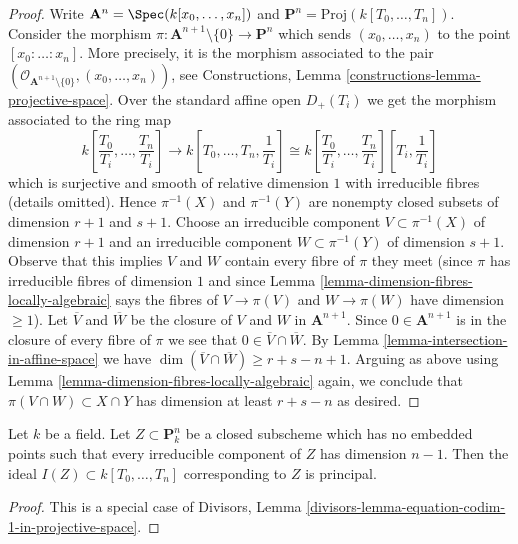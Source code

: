 \begin{proof}
Write $\mathbf{A}^n = \Spec(k[x_0, \ldots, x_n])$ and
$\mathbf{P}^n = \text{Proj}(k[T_0, \ldots, T_n])$.
Consider the morphism
$\pi : \mathbf{A}^{n + 1} \setminus \{0\} \to \mathbf{P}^n$
which sends $(x_0, \ldots, x_n)$ to the point $[x_0 : \ldots : x_n]$.
More precisely, it is the morphism associated to the pair
$(\mathcal{O}_{\mathbf{A}^{n + 1} \setminus \{0\}}, (x_0, \ldots, x_n))$,
see Constructions, Lemma \ref{constructions-lemma-projective-space}.
Over the standard affine open $D_+(T_i)$ we get the morphism
associated to the ring map
$$
k\left[\frac{T_0}{T_i}, \ldots, \frac{T_n}{T_i}\right]
\longrightarrow
k\left[T_0, \ldots, T_n, \frac{1}{T_i}\right] \cong
k\left[\frac{T_0}{T_i}, \ldots, \frac{T_n}{T_i}\right]
\left[T_i, \frac{1}{T_i}\right]
$$
which is surjective and smooth of relative dimension $1$
with irreducible fibres (details omitted).
Hence $\pi^{-1}(X)$ and $\pi^{-1}(Y)$ are nonempty closed subsets of
dimension $r + 1$ and $s + 1$. Choose an irreducible component
$V \subset \pi^{-1}(X)$ of dimension $r + 1$ and an
irreducible component $W \subset \pi^{-1}(Y)$ of dimension $s + 1$.
Observe that this implies $V$ and $W$ contain every fibre of $\pi$
they meet (since $\pi$ has irreducible fibres of dimension $1$
and since Lemma \ref{lemma-dimension-fibres-locally-algebraic}
says the fibres of $V \to \pi(V)$ and $W \to \pi(W)$ have dimension $\geq 1$).
Let $\overline{V}$ and $\overline{W}$ be the closure of
$V$ and $W$ in $\mathbf{A}^{n + 1}$. Since $0 \in \mathbf{A}^{n + 1}$
is in the closure of every fibre of $\pi$ we see that
$0 \in \overline{V} \cap \overline{W}$. By
Lemma \ref{lemma-intersection-in-affine-space}
we have $\dim(\overline{V} \cap \overline{W}) \geq r + s - n + 1$.
Arguing as above using Lemma \ref{lemma-dimension-fibres-locally-algebraic}
again, we conclude that $\pi(V \cap W) \subset X \cap Y$
has dimension at least $r + s - n$ as desired.
\end{proof}

\begin{lemma}
\label{lemma-equation-codim-1-in-projective-space}
Let $k$ be a field. Let $Z \subset \mathbf{P}^n_k$ be a closed subscheme
which has no embedded points such that every irreducible component
of $Z$ has dimension $n - 1$. Then the ideal $I(Z) \subset k[T_0, \ldots, T_n]$
corresponding to $Z$ is principal.
\end{lemma}

\begin{proof}
This is a special case of
Divisors, Lemma \ref{divisors-lemma-equation-codim-1-in-projective-space}.
\end{proof}




